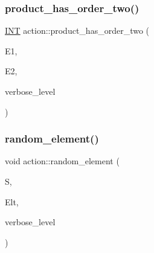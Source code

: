 \mbox{\label{classaction_af23981c4ce591ca41b23133eb362186a}} 
\subsubsection{\texorpdfstring{product\+\_\+has\+\_\+order\+\_\+two()}{product\_has\_order\_two()}}
{\footnotesize\ttfamily \mbox{\hyperlink{galois_8h_a09fddde158a3a20bd2dcadb609de11dc}{I\+NT}} action\+::product\+\_\+has\+\_\+order\+\_\+two (\begin{DoxyParamCaption}\item[{\mbox{\hyperlink{galois_8h_a09fddde158a3a20bd2dcadb609de11dc}{I\+NT}} $\ast$}]{E1,  }\item[{\mbox{\hyperlink{galois_8h_a09fddde158a3a20bd2dcadb609de11dc}{I\+NT}} $\ast$}]{E2,  }\item[{\mbox{\hyperlink{galois_8h_a09fddde158a3a20bd2dcadb609de11dc}{I\+NT}}}]{verbose\+\_\+level }\end{DoxyParamCaption})}

\mbox{\label{classaction_a236a20c58ca2911ce774257234b7ee14}} 
\subsubsection{\texorpdfstring{random\+\_\+element()}{random\_element()}}
{\footnotesize\ttfamily void action\+::random\+\_\+element (\begin{DoxyParamCaption}\item[{\mbox{\hyperlink{classsims}{sims}} $\ast$}]{S,  }\item[{\mbox{\hyperlink{galois_8h_a09fddde158a3a20bd2dcadb609de11dc}{I\+NT}} $\ast$}]{Elt,  }\item[{\mbox{\hyperlink{galois_8h_a09fddde158a3a20bd2dcadb609de11dc}{I\+NT}}}]{verbose\+\_\+level }\end{DoxyParamCaption})}

\mbox{\label{classaction_a04633f855952d34d7202126a895fd45b}} 
